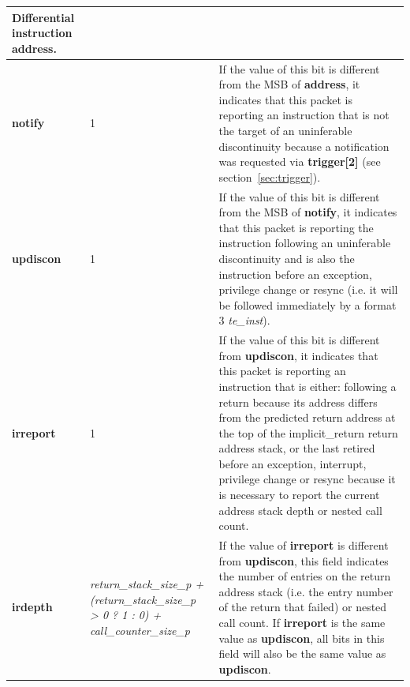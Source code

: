 \begin{table}[htp]
\begin{tabulary}{\textwidth}{|l|p{35mm}|p{90mm}|}
                Differential instruction address.\\
    \hline
    \textbf{notify}	& 1 & 
                If the value of this bit is different from the MSB of \textbf{address}, it indicates that this 
                packet is reporting an instruction that is not the target of an uninferable discontinuity 
                because a notification was requested via \textbf{trigger[2]} (see section~\ref{sec:trigger}). \\
    \hline
    \textbf{updiscon}	& 1 & 
                If the value of this bit is different from the MSB of \textbf{notify}, it indicates that this 
                packet is reporting the instruction following an uninferable discontinuity and is also the 
                instruction before an exception, privilege change or resync 
                (i.e. it will be followed immediately by a format 3 \textit{te\_inst}).\\
    \hline
    \textbf{irreport}	& 1 & 
                If the value of this bit is different from \textbf{updiscon}, it indicates that this packet is
                reporting an instruction that is either: \newline
                following a return because its address differs from the predicted return address at the top of 
                the implicit\_return return address stack, or \newline
                the last retired before an exception, interrupt, privilege change or resync because it is necessary to report 
                the current address stack depth or nested call count. \\
    \hline
    \textbf{irdepth}	& \textit {return\_stack\_size\_p + (return\_stack\_size\_p > 0 ? 1 : 0) + call\_counter\_size\_p} & 
                If the value of \textbf{irreport} is different from \textbf{updiscon}, this field 
		indicates the number of entries on the return address stack (i.e. the entry number of the return that
                failed) or nested call count.  If \textbf{irreport} is the same value as \textbf{updiscon}, 
                all bits in this field  will also be the same value as \textbf{updiscon}. \\
    \hline
  \end{tabulary}
\end{table}

